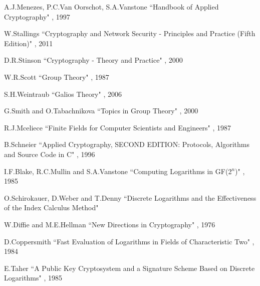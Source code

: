 \documentclass[iwp,first]{luthesis}
\begin{document}

\cleardoublepage
{}

\begin{thebibliography}{33}
 A.J.Menezes, P.C.Van Oorschot, S.A.Vanstone
\newblock ``Handbook of Applied Cryptography"
, 1997

 W.Stallings
\newblock ``Cryptography and Network Security - Principles and Practice (Fifth Edition)"
, 2011

 D.R.Stinson
\newblock ``Cryptography - Theory and Practice"
, 2000

 W.R.Scott
\newblock ``Group Theory"
, 1987

 S.H.Weintraub
\newblock``Galios Theory"
, 2006

 G.Smith and O.Tabachnikova
\newblock ``Topics in Group Theory"
, 2000

 R.J.Mceliece
\newblock``Finite Fields for Computer Scientists and Engineers"
, 1987

 B.Schneier
\newblock ``Applied Cryptography, SECOND EDITION: Protocols, Algorithms and Source Code in C"
, 1996

 I.F.Blake, R.C.Mullin and S.A.Vanstone
\newblock ``Computing Logarithms in GF(2$^n$)"
,  1985

 O.Schirokauer, D.Weber and T.Denny
\newblock``Discrete Logarithms and the Effectiveness of the Index Calculus Method"

 W.Diffie and M.E.Hellman
\newblock``New Directions in Cryptography"
, 1976

 D.Coppersmith
\newblock ``Fast Evaluation of Logarithms in Fields of Characteristic Two"
, 1984

 E.Taher
\newblock``A Public Key Cryptosystem and a Signature Scheme Based on Discrete Logarithms"
,  1985


\end{thebibliography}
\end{document}
